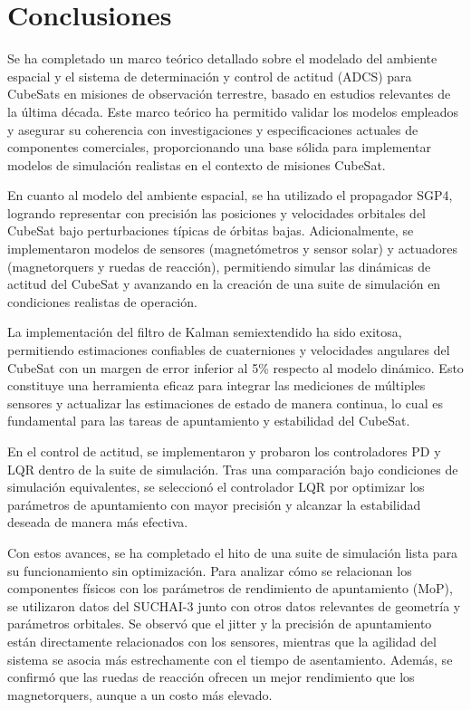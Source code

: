 \section{Conclusiones}


Se ha completado un marco teórico detallado sobre el modelado del ambiente espacial y el sistema de determinación y control de actitud (ADCS) para CubeSats en misiones de observación terrestre, basado en estudios relevantes de la última década. Este marco teórico ha permitido validar los modelos empleados y asegurar su coherencia con investigaciones y especificaciones actuales de componentes comerciales, proporcionando una base sólida para implementar modelos de simulación realistas en el contexto de misiones CubeSat.

En cuanto al modelo del ambiente espacial, se ha utilizado el propagador SGP4, logrando representar con precisión las posiciones y velocidades orbitales del CubeSat bajo perturbaciones típicas de órbitas bajas. Adicionalmente, se implementaron modelos de sensores (magnetómetros y sensor solar) y actuadores (magnetorquers y ruedas de reacción), permitiendo simular las dinámicas de actitud del CubeSat y avanzando en la creación de una suite de simulación en condiciones realistas de operación.

La implementación del filtro de Kalman semiextendido ha sido exitosa, permitiendo estimaciones confiables de cuaterniones y velocidades angulares del CubeSat con un margen de error inferior al 5\% respecto al modelo dinámico. Esto constituye una herramienta eficaz para integrar las mediciones de múltiples sensores y actualizar las estimaciones de estado de manera continua, lo cual es fundamental para las tareas de apuntamiento y estabilidad del CubeSat.

En el control de actitud, se implementaron y probaron los controladores PD y LQR dentro de la suite de simulación. Tras una comparación bajo condiciones de simulación equivalentes, se seleccionó el controlador LQR por optimizar los parámetros de apuntamiento con mayor precisión y alcanzar la estabilidad deseada de manera más efectiva.

Con estos avances, se ha completado el hito de una suite de simulación lista para su funcionamiento sin optimización. Para analizar cómo se relacionan los componentes físicos con los parámetros de rendimiento de apuntamiento (MoP), se utilizaron datos del SUCHAI-3 junto con otros datos relevantes de geometría y parámetros orbitales. Se observó que el jitter y la precisión de apuntamiento están directamente relacionados con los sensores, mientras que la agilidad del sistema se asocia más estrechamente con el tiempo de asentamiento. Además, se confirmó que las ruedas de reacción ofrecen un mejor rendimiento que los magnetorquers, aunque a un costo más elevado.

